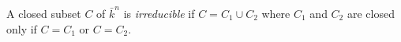 A closed subset $C$ of $\bar{k}^n$ is \textit{irreducible} if $C = C_1 \cup C_2$ where $C_1$ and $C_2$ are closed only if $C = C_1$ or $C = C_2$.
